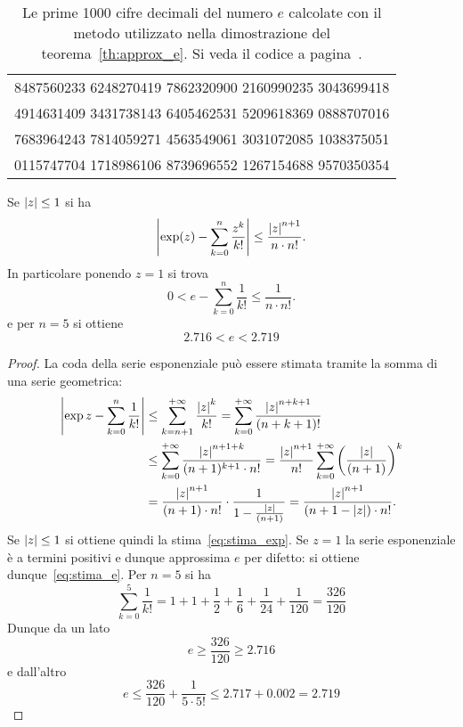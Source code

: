 \begin{table}
\begin{center}
\begin{tabular}{r}
\ttfamily\footnotesize   8487560233 6248270419 7862320900 2160990235 3043699418 \\
\ttfamily\footnotesize   4914631409 3431738143 6405462531 5209618369 0888707016 \\
\ttfamily\footnotesize   7683964243 7814059271 4563549061 3031072085 1038375051 \\
\ttfamily\footnotesize   0115747704 1718986106 8739696552 1267154688 9570350354
\end{tabular}
\end{center}
\caption{Le prime 1000 cifre decimali del numero $e$
calcolate con il metodo utilizzato nella dimostrazione
del teorema~\ref{th:approx_e}.
Si veda il codice a pagina~\pageref{code:compute_e}.}
\label{fig:cifre_e}
\end{table}

\begin{theorem}
  \label{th:approx_exp}%
  \label{th:approx_e}%
  Se ${\left|z\right|}\le 1$ si ha 
  \begin{equation}\label{eq:stima_exp}
    {\left|\exp(z) - \sum_{k=0}^n \frac{z^k}{k!}\right|}
    \le \frac{{\left|z\right|}^{n+1}}{n\cdot n!}.
  \end{equation}
  In particolare ponendo $z=1$ si trova
  \begin{equation}\label{eq:stima_e}
     0 < e - \sum_{k=0}^n \frac{1}{k!} \le \frac{1}{n \cdot n!}.
  \end{equation}
  e per $n=5$ si ottiene
  \begin{equation}
    2.716 < e < 2.719
  \end{equation}
  \end{theorem}
  \begin{proof}
  La coda della serie esponenziale può essere stimata 
  tramite la somma di una serie geometrica:
  \begin{align*}
    {\left|\exp z - \sum_{k=0}^n \frac 1 {k!}\right|}
    & \le \sum_{k=n+1}^{+\infty} \frac{{\left|z\right|}^k}{k!} 
     = \sum_{k=0}^{+\infty}\frac{{\left|z\right|}^{n+k+1}}{(n+k+1)!} \\
    & \le \sum_{k=0}^{+\infty}\frac{{\left|z\right|}^{n+1+k}}{(n+1)^{k+1}\cdot n!}
     = \frac{{\left|z\right|}^{n+1}}{n!}\sum_{k=0}^{+\infty} {\left( \frac{{\left|z\right|}}{(n+1)} \right)}^k \\
    & = \frac{{\left|z\right|}^{n+1}}{(n+1)\cdot n!} \cdot \frac{1}{1-\frac{{\left|z\right|}}{(n+1)}} 
     = \frac{{\left|z\right|}^{n+1}}{(n+1-{\left|z\right|})\cdot n!}.
  \end{align*}
  Se ${\left|z\right|}\le 1$ si ottiene quindi la stima~\eqref{eq:stima_exp}.
  Se $z=1$ la serie esponenziale è a termini positivi e dunque 
  approssima $e$ per difetto: si ottiene dunque~\eqref{eq:stima_e}.
  Per $n=5$ si ha
  \[
   \sum_{k=0}^5 \frac{1}{k!} = 1 + 1 + \frac 1 2 + \frac{1}{6} + \frac {1}{24} + \frac{1}{120}
   = \frac{326}{120}
  \]
  Dunque da un lato
  \[
    e \ge \frac{326}{120} \ge 2.716
  \]
  e dall'altro
  \[
   e \le \frac{326}{120} + \frac{1}{5\cdot 5!}
     \le 2.717 + 0.002 = 2.719
  \]
\end{proof}
  
